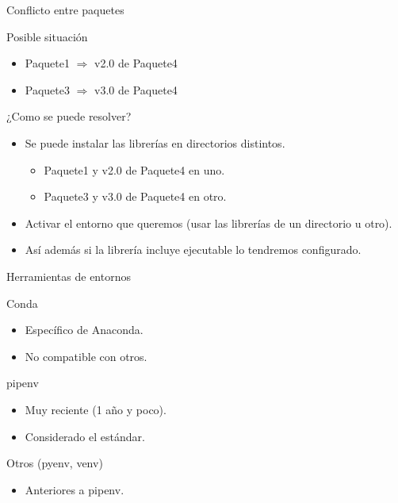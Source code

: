 \documentclass[bigger,unknownkeysallowed]{beamer}
\begin{document}
\begin{frame}[label={sec:orgcbb08a1}]{Conflicto entre paquetes}
\begin{block}{Posible situación}
\begin{itemize}
\item Paquete1 \(\Rightarrow\) v2.0 de Paquete4

\item Paquete3 \(\Rightarrow\) v3.0 de Paquete4
\end{itemize}
\end{block}

\begin{block}{¿Como se puede resolver?}
\begin{itemize}
\item Se puede instalar las librerías en directorios distintos.
\begin{itemize}
\item Paquete1 y v2.0 de Paquete4 en uno.
\item Paquete3 y v3.0 de Paquete4 en otro.
\end{itemize}

\item Activar el entorno que queremos (usar las librerías de un directorio u otro).

\item Así además si la librería incluye ejecutable lo tendremos configurado.
\end{itemize}
\end{block}
\end{frame}

\begin{frame}[label={sec:org84a097d}]{Herramientas de entornos}
\begin{block}{Conda}
\begin{itemize}
\item Específico de Anaconda.

\item No compatible con otros.
\end{itemize}
\end{block}

\begin{block}{pipenv}
\begin{itemize}
\item Muy reciente (1 año y poco).

\item Considerado el estándar.
\end{itemize}
\end{block}

\begin{block}{Otros (pyenv, venv)}
\begin{itemize}
\item Anteriores a pipenv.
\end{itemize}
\end{block}
\end{frame}
\end{document}
